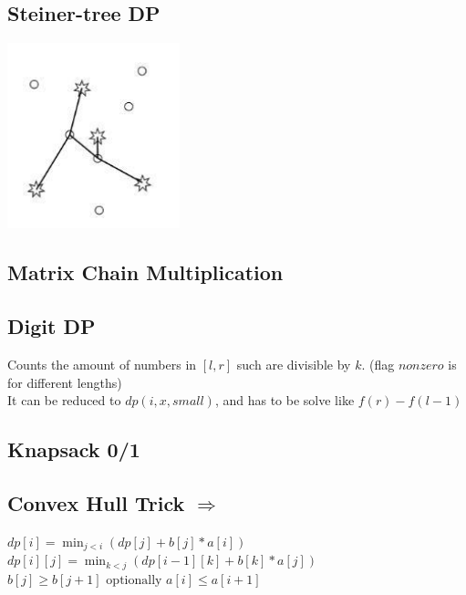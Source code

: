
\subsection{Steiner-tree DP}
\includegraphics[width = 5cm]{../Codes/DynamicProgramming/SteinerTree.png}
\vspace{-15pt}

\subsection{Matrix Chain Multiplication}

\subsection{Digit DP} 
\vspace{-5pt}
Counts the amount of numbers in $[l, r]$ such are divisible by $k$. (flag $nonzero$ is for different lengths)  \\
It can be reduced to $dp(i, x, small)$, and has to be solve like $f(r) - f(l - 1)$ \\
\vspace{-5pt}
\vspace{-15pt}

\subsection{Knapsack 0/1}

\subsection{Convex Hull Trick  $\Rightarrow$ }
$ dp[i] = \min_{j < i}(dp[j] + b[j] * a[i]) $ \\
$ dp[i][j] = \min_{k < j}(dp[i - 1][k] + b[k] * a[j]) $ \\
$ b[j] \geq b[j + 1] \text{ optionally } a[i] \leq a[i + 1] $ \\ 

